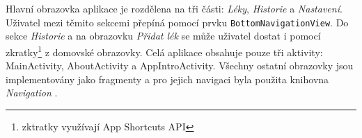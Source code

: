 \documentclass[../TakeYourPill.tex]{subfiles}
\begin{document}
Hlavní obrazovka aplikace je rozdělena na tři části: \textit{Léky}, \textit{Historie} a \textit{Nastavení}. Uživatel mezi těmito sekcemi přepíná pomocí prvku \texttt{BottomNavigationView}. Do sekce \textit{Historie} a na obrazovku \textit{Přidat lék} se může uživatel dostat i pomocí zkratky\footnote{zktratky využívají App Shortcuts API} z domovské obrazovky. Celá aplikace obsahuje pouze tři aktivity: MainActivity, AboutActivity a AppIntroActivity. Všechny ostatní obrazovky jsou implementovány jako fragmenty a pro jejich navigaci byla použita knihovna \textit{Navigation} \cite{navigation}.
\end{document}
